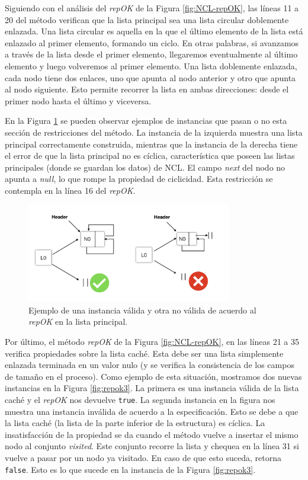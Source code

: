 Siguiendo con el análisis del \emph{repOK} de la Figura \ref{fig:NCL-repOK}, las líneas 11 a 20 del método verifican que la lista principal 
sea una lista circular doblemente enlazada. Una lista circular es aquella en la que el último elemento de la lista está enlazado al primer elemento, formando un ciclo. 
En otras palabras, si avanzamos a través de la lista desde el primer elemento, llegaremos eventualmente al último elemento y luego volveremos al primer elemento.
Una lista doblemente enlazada, cada nodo tiene dos enlaces, uno que apunta al nodo anterior y otro que apunta al nodo siguiente. 
Esto permite recorrer la lista en ambas direcciones: desde el primer nodo hasta el último y viceversa.

En la Figura \ref{fig:repok2} se pueden observar ejemplos de instancias que pasan o no esta sección de restricciones del método. 
La instancia de la izquierda muestra una lista principal correctamente construida, mientras que la instancia de la derecha tiene el error de que la lista principal no es cíclica, 
característica que poseen las listas principales (donde se guardan los datos) de NCL. 
El campo \emph{next} del nodo no apunta a \emph{null}, lo que rompe la propiedad de ciclicidad. 
Esta restricción se contempla en la línea 16 del \emph{repOK}.

\begin{figure}[H]
  \centering
  \includegraphics[width=0.8\textwidth]{images/repok2.jpg}
  \caption{Ejemplo de una instancia válida y otra no válida de acuerdo al \emph{repOK} en la lista principal.}
  \label{fig:repok2}
\end{figure}

Por último, el método \emph{repOK} de la Figura \ref{fig:NCL-repOK}, en las líneas 21 a 35 verifica propiedades sobre la lista caché. 
Esta debe ser una lista simplemente enlazada terminada en un valor nulo (y se verifica la consistencia de los campos de tamaño en el proceso). 
Como ejemplo de esta situación, mostramos dos nuevas instancias en la Figura \ref{fig:repok3}. 
La primera es una instancia válida de la lista caché y el \emph{repOK} nos devuelve \texttt{true}. 
La segunda instancia en la figura nos muestra una instancia inválida de acuerdo a la especificación. 
Esto se debe a que la lista caché (la lista de la parte inferior de la estructura) es cíclica. 
La insatisfacción de la propiedad se da cuando el método vuelve a insertar el mismo nodo al conjunto \emph{visited}. 
Este conjunto recorre la lista y chequea en la línea 31 si vuelve a pasar por un nodo ya visitado. 
En caso de que esto suceda, retorna \texttt{false}. Esto es lo que sucede en la instancia de la Figura \ref{fig:repok3}.

